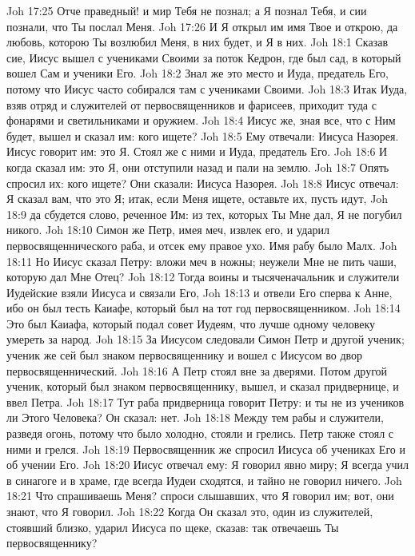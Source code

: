 \vs Joh 17:25 Отче праведный! и мир Тебя не познал; а Я познал Тебя, и сии познали, что Ты послал Меня.
\vs Joh 17:26 И Я открыл им имя Твое и открою, да любовь, которою Ты возлюбил Меня, в них будет, и Я в них.
\vs Joh 18:1 Сказав сие, Иисус вышел с учениками Своими за поток Кедрон, где был сад, в который вошел Сам и ученики Его.
\vs Joh 18:2 Знал же это место и Иуда, предатель Его, потому что Иисус часто собирался там с учениками Своими.
\vs Joh 18:3 Итак Иуда, взяв отряд  и служителей от первосвященников и фарисеев, приходит туда с фонарями и светильниками и оружием.
\vs Joh 18:4 Иисус же, зная все, что с Ним будет, вышел и сказал им: кого ищете?
\vs Joh 18:5 Ему отвечали: Иисуса Назорея. Иисус говорит им: это Я. Стоял же с ними и Иуда, предатель Его.
\vs Joh 18:6 И когда сказал им: это Я, они отступили назад и пали на землю.
\vs Joh 18:7 Опять спросил их: кого ищете? Они сказали: Иисуса Назорея.
\vs Joh 18:8 Иисус отвечал: Я сказал вам, что это Я; итак, если Меня ищете, оставьте их, пусть идут,
\vs Joh 18:9 да сбудется слово, реченное Им: из тех, которых Ты Мне дал, Я не погубил никого.
\vs Joh 18:10 Симон же Петр, имея меч, извлек его, и ударил первосвященнического раба, и отсек ему правое ухо. Имя рабу было Малх.
\vs Joh 18:11 Но Иисус сказал Петру: вложи меч в ножны; неужели Мне не пить чаши, которую дал Мне Отец?
\vs Joh 18:12 Тогда воины и тысяченачальник и служители Иудейские взяли Иисуса и связали Его,
\rsbpar\vs Joh 18:13 и отвели Его сперва к Анне, ибо он был тесть Каиафе, который был на тот год первосвященником.
\vs Joh 18:14 Это был Каиафа, который подал совет Иудеям, что лучше одному человеку умереть за народ.
\rsbpar\vs Joh 18:15 За Иисусом следовали Симон Петр и другой ученик; ученик же сей был знаком первосвященнику и вошел с Иисусом во двор первосвященнический.
\vs Joh 18:16 А Петр стоял вне за дверями. Потом другой ученик, который был знаком первосвященнику, вышел, и сказал придвернице, и ввел Петра.
\vs Joh 18:17 Тут раба придверница говорит Петру: и ты не из учеников ли Этого Человека? Он сказал: нет.
\vs Joh 18:18 Между тем рабы и служители, разведя огонь, потому что было холодно, стояли и грелись. Петр также стоял с ними и грелся.
\rsbpar\vs Joh 18:19 Первосвященник же спросил Иисуса об учениках Его и об учении Его.
\vs Joh 18:20 Иисус отвечал ему: Я говорил явно миру; Я всегда учил в синагоге и в храме, где всегда Иудеи сходятся, и тайно не говорил ничего.
\vs Joh 18:21 Что спрашиваешь Меня? спроси слышавших, что Я говорил им; вот, они знают, что Я говорил.
\vs Joh 18:22 Когда Он сказал это, один из служителей, стоявший близко, ударил Иисуса по щеке, сказав: так отвечаешь Ты первосвященнику?

